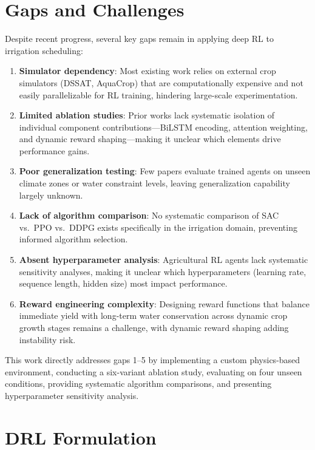 \documentclass[12pt, a4paper]{article}
\begin{document}
\section{Gaps and Challenges}

Despite recent progress, several key gaps remain in applying deep RL to irrigation scheduling:

\begin{enumerate}
    \item \textbf{Simulator dependency}: Most existing work relies on external crop simulators (DSSAT, AquaCrop) that are computationally expensive and not easily parallelizable for RL training, hindering large-scale experimentation.
    \item \textbf{Limited ablation studies}: Prior works lack systematic isolation of individual component contributions---BiLSTM encoding, attention weighting, and dynamic reward shaping---making it unclear which elements drive performance gains.
    \item \textbf{Poor generalization testing}: Few papers evaluate trained agents on unseen climate zones or water constraint levels, leaving generalization capability largely unknown.
    \item \textbf{Lack of algorithm comparison}: No systematic comparison of SAC vs.\ PPO vs.\ DDPG exists specifically in the irrigation domain, preventing informed algorithm selection.
    \item \textbf{Absent hyperparameter analysis}: Agricultural RL agents lack systematic sensitivity analyses, making it unclear which hyperparameters (learning rate, sequence length, hidden size) most impact performance.
    \item \textbf{Reward engineering complexity}: Designing reward functions that balance immediate yield with long-term water conservation across dynamic crop growth stages remains a challenge, with dynamic reward shaping adding instability risk.
\end{enumerate}

This work directly addresses gaps 1--5 by implementing a custom physics-based environment, conducting a six-variant ablation study, evaluating on four unseen conditions, providing systematic algorithm comparisons, and presenting hyperparameter sensitivity analysis.

\section{DRL Formulation}
\end{document}

